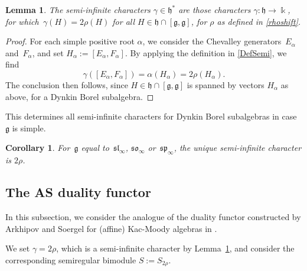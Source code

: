 \documentclass[11pt]{amsart}
\newcommand{\htt}{\mathsf{ht}}
\newcommand{\TT}{\mathscr{T}}
\newcommand{\rR}{\Phi}
\newcommand{\bC}{\mathbf{C}}
\newcommand{\bBN}{\mathscr{B}\hspace{-0.3mm}\mathscr{N}}
\newcommand{\ad}{\mathrm{ad}}
\newcommand{\mk}{\Bbbk}
\newcommand{\fg}{\mathfrak{g}}
\newcommand{\fh}{\mathfrak{h}}
\newcommand{\mZ}{\mathbb{Z}}
\numberwithin{equation}{section}
\theoremstyle{plain}
\newtheorem{lemma}[subsubsection]{Lemma}
\newtheorem{cor}[subsubsection]{Corollary}
\theoremstyle{remark}
\theoremstyle{remark}
\theoremstyle{construction}
\begin{document}
\begin{lemma}\label{Lem2rho}The semi-infinite characters $\gamma\in\fh^\ast$ are those characters $\gamma:\fh\to\mk$, for which~$\gamma(H)=2\rho(H)$ for all $H\in \fh\cap[\fg,\fg]${, for $\rho$ as defined} in \ref{rhoshift}.
\end{lemma}
\begin{proof}
For each simple positive root $\alpha$, we consider the Chevalley generator{s}~$E_\alpha$ and~$F_\alpha$, and set $ H_\alpha:=[E_\alpha,F_\alpha]$. By applying the definition in \ref{DefSemi}, we find
$$\gamma([E_\alpha,F_\alpha])=\alpha(H_\alpha)={2\rho(H_\alpha)}.$$
 The conclusion then follows, since $H\in \fh\cap[\fg,\fg]$ is spanned by vectors $H_\alpha$ as above, for a Dynkin Borel subalgebra.
\end{proof}
This determines all semi-infinite characters for Dynkin Borel subalgebras in case $\fg$ is simple.
\begin{cor}
For~$\fg$ equal to~$\mathfrak{sl}_\infty$, $\mathfrak{so}_\infty$ or~$\mathfrak{sp}_\infty$, the unique semi-infinite character is $2\rho$.
\end{cor}






\subsection{The AS duality functor} In this subsection, we consider the analogue of the duality functor constructed by Arkhipov and Soergel for (affine) Kac-Moody algebras in \cite{Arkhipov, Soergel}.




We set $\gamma=2\rho$, which is a semi-infinite character by Lemma~\ref{Lem2rho}, and consider the corresponding semiregular bimodule   {$S:=S_{2\rho}$}.


\end{document}
